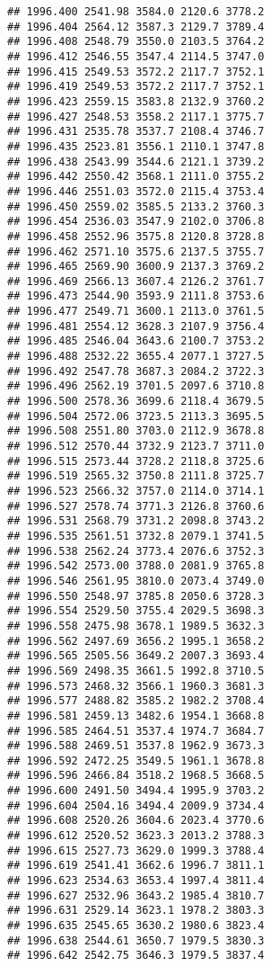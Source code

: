 \documentclass[
]{article}
\begin{document}
\begin{verbatim}
## 1996.400 2541.98 3584.0 2120.6 3778.2
## 1996.404 2564.12 3587.3 2129.7 3789.4
## 1996.408 2548.79 3550.0 2103.5 3764.2
## 1996.412 2546.55 3547.4 2114.5 3747.0
## 1996.415 2549.53 3572.2 2117.7 3752.1
## 1996.419 2549.53 3572.2 2117.7 3752.1
## 1996.423 2559.15 3583.8 2132.9 3760.2
## 1996.427 2548.53 3558.2 2117.1 3775.7
## 1996.431 2535.78 3537.7 2108.4 3746.7
## 1996.435 2523.81 3556.1 2110.1 3747.8
## 1996.438 2543.99 3544.6 2121.1 3739.2
## 1996.442 2550.42 3568.1 2111.0 3755.2
## 1996.446 2551.03 3572.0 2115.4 3753.4
## 1996.450 2559.02 3585.5 2133.2 3760.3
## 1996.454 2536.03 3547.9 2102.0 3706.8
## 1996.458 2552.96 3575.8 2120.8 3728.8
## 1996.462 2571.10 3575.6 2137.5 3755.7
## 1996.465 2569.90 3600.9 2137.3 3769.2
## 1996.469 2566.13 3607.4 2126.2 3761.7
## 1996.473 2544.90 3593.9 2111.8 3753.6
## 1996.477 2549.71 3600.1 2113.0 3761.5
## 1996.481 2554.12 3628.3 2107.9 3756.4
## 1996.485 2546.04 3643.6 2100.7 3753.2
## 1996.488 2532.22 3655.4 2077.1 3727.5
## 1996.492 2547.78 3687.3 2084.2 3722.3
## 1996.496 2562.19 3701.5 2097.6 3710.8
## 1996.500 2578.36 3699.6 2118.4 3679.5
## 1996.504 2572.06 3723.5 2113.3 3695.5
## 1996.508 2551.80 3703.0 2112.9 3678.8
## 1996.512 2570.44 3732.9 2123.7 3711.0
## 1996.515 2573.44 3728.2 2118.8 3725.6
## 1996.519 2565.32 3750.8 2111.8 3725.7
## 1996.523 2566.32 3757.0 2114.0 3714.1
## 1996.527 2578.74 3771.3 2126.8 3760.6
## 1996.531 2568.79 3731.2 2098.8 3743.2
## 1996.535 2561.51 3732.8 2079.1 3741.5
## 1996.538 2562.24 3773.4 2076.6 3752.3
## 1996.542 2573.00 3788.0 2081.9 3765.8
## 1996.546 2561.95 3810.0 2073.4 3749.0
## 1996.550 2548.97 3785.8 2050.6 3728.3
## 1996.554 2529.50 3755.4 2029.5 3698.3
## 1996.558 2475.98 3678.1 1989.5 3632.3
## 1996.562 2497.69 3656.2 1995.1 3658.2
## 1996.565 2505.56 3649.2 2007.3 3693.4
## 1996.569 2498.35 3661.5 1992.8 3710.5
## 1996.573 2468.32 3566.1 1960.3 3681.3
## 1996.577 2488.82 3585.2 1982.2 3708.4
## 1996.581 2459.13 3482.6 1954.1 3668.8
## 1996.585 2464.51 3537.4 1974.7 3684.7
## 1996.588 2469.51 3537.8 1962.9 3673.3
## 1996.592 2472.25 3549.5 1961.1 3678.8
## 1996.596 2466.84 3518.2 1968.5 3668.5
## 1996.600 2491.50 3494.4 1995.9 3703.2
## 1996.604 2504.16 3494.4 2009.9 3734.4
## 1996.608 2520.26 3604.6 2023.4 3770.6
## 1996.612 2520.52 3623.3 2013.2 3788.3
## 1996.615 2527.73 3629.0 1999.3 3788.4
## 1996.619 2541.41 3662.6 1996.7 3811.1
## 1996.623 2534.63 3653.4 1997.4 3811.4
## 1996.627 2532.96 3643.2 1985.4 3810.7
## 1996.631 2529.14 3623.1 1978.2 3803.3
## 1996.635 2545.65 3630.2 1980.6 3823.4
## 1996.638 2544.61 3650.7 1979.5 3830.3
## 1996.642 2542.75 3646.3 1979.5 3837.4

\end{verbatim}
\end{document}
